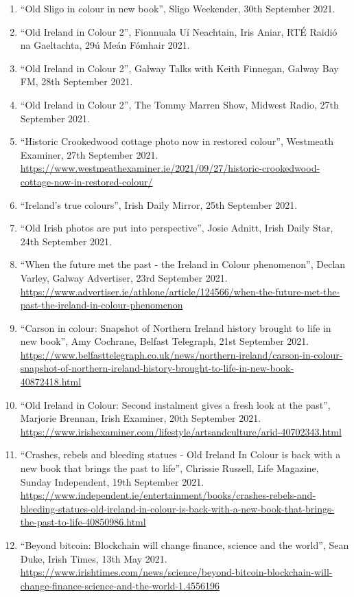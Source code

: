 \documentclass[10pt,a4paper]{res} %
\begin{document}
\begin{resume}
{\begin{enumerate}
\item ``Old Sligo in colour in new book'', Sligo Weekender, 30th September 2021.
\item ``Old Ireland in Colour 2'', Fionnuala U\'{i} Neachtain, Iris Aniar, RT\'{E} Raidi\'{o} na Gaeltachta, 29\'{u} Me\'{a}n F\'{o}mhair 2021.
\item ``Old Ireland in Colour 2'', Galway Talks with Keith Finnegan, Galway Bay FM, 28th September 2021.
\item ``Old Ireland in Colour 2'', The Tommy Marren Show, Midwest Radio, 27th September 2021.
\item ``Historic Crookedwood cottage photo now in restored colour'', Westmeath Examiner, 27th September 2021. \url{https://www.westmeathexaminer.ie/2021/09/27/historic-crookedwood-cottage-now-in-restored-colour/}
\item ``Ireland's true colours'', Irish Daily Mirror, 25th September 2021.
\item ``Old Irish photos are put into perspective'', Josie Adnitt, Irish Daily Star, 24th September 2021.
\item ``When the future met the past - the Ireland in Colour phenomenon'', Declan Varley, Galway Advertiser, 23rd September 2021. \url{https://www.advertiser.ie/athlone/article/124566/when-the-future-met-the-past-the-ireland-in-colour-phenomenon}
\item ``Carson in colour: Snapshot of Northern Ireland history brought to life in new book'', Amy Cochrane, Belfast Telegraph, 21st September 2021. \url{https://www.belfasttelegraph.co.uk/news/northern-ireland/carson-in-colour-snapshot-of-northern-ireland-history-brought-to-life-in-new-book-40872418.html}
\item ``Old Ireland in Colour: Second instalment gives a fresh look at the past'', Marjorie Brennan, Irish Examiner, 20th September 2021. \url{https://www.irishexaminer.com/lifestyle/artsandculture/arid-40702343.html}
\item ``Crashes, rebels and bleeding statues - Old Ireland In Colour is back with a new book that brings the past to life'', Chrissie Russell, Life Magazine, Sunday Independent, 19th September 2021. \url{https://www.independent.ie/entertainment/books/crashes-rebels-and-bleeding-statues-old-ireland-in-colour-is-back-with-a-new-book-that-brings-the-past-to-life-40850986.html}
\item ``Beyond bitcoin: Blockchain will change finance, science and the world'', Sean Duke, Irish Times, 13th May 2021. \url{https://www.irishtimes.com/news/science/beyond-bitcoin-blockchain-will-change-finance-science-and-the-world-1.4556196}

\end{enumerate}}
\end{resume}
\end{document}
